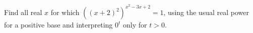 Find all real $x$ for which $((x+2)^2)^{x^2-3x+2}=1$, using the usual real power for a positive base and interpreting $0^t$ only for $t>0$.
